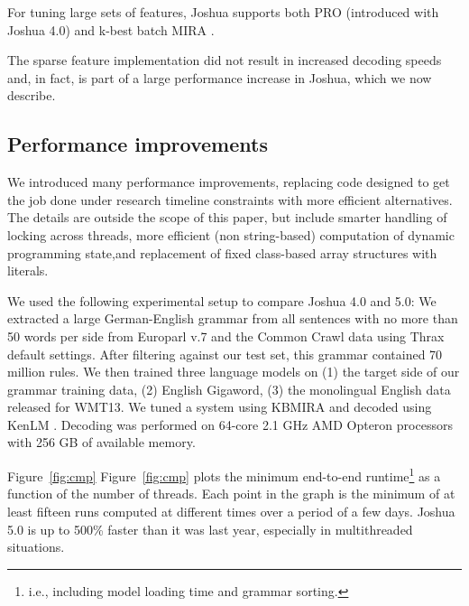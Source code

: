 \documentclass[11pt]{article}
\begin{document}
For tuning large sets of features, Joshua supports both PRO
\cite{PRO2011} (introduced with Joshua 4.0) and k-best batch MIRA
\cite{cherry2012batch}.

The sparse feature implementation did not result in increased decoding
speeds and, in fact, is part of a large performance increase in
Joshua, which we now describe.

\subsection{Performance improvements}

We introduced many performance improvements, replacing code designed
to get the job done under research timeline constraints with more
efficient alternatives. The details are outside the scope of this
paper, but include smarter handling of locking across threads, more
efficient (non string-based) computation of dynamic programming state,and
replacement of fixed class-based array structures with literals.

We used the following experimental setup to compare Joshua 4.0 and
5.0: We extracted a large German-English grammar from all sentences
with no more than 50 words per side from Europarl v.7 and the Common
Crawl data using Thrax default settings.  After filtering against our
test set, this grammar contained 70 million rules.  We then trained
three language models on (1) the target side of our grammar training
data, (2) English Gigaword, (3) the monolingual English data released
for WMT13. We tuned a system using KBMIRA and decoded using KenLM
\cite{KenLM}.  Decoding was performed on 64-core 2.1 GHz AMD Opteron
processors with 256 GB of available memory.

Figure~\ref{fig:cmp} Figure~\ref{fig:cmp} plots the minimum end-to-end
runtime\footnote{i.e., including model loading time and grammar
  sorting.} as a function of the number of threads.  Each point in the
graph is the minimum of at least fifteen runs computed at different
times over a period of a few days.  Joshua 5.0 is up to 500\% faster
than it was last year, especially in multithreaded situations.
\end{document}
